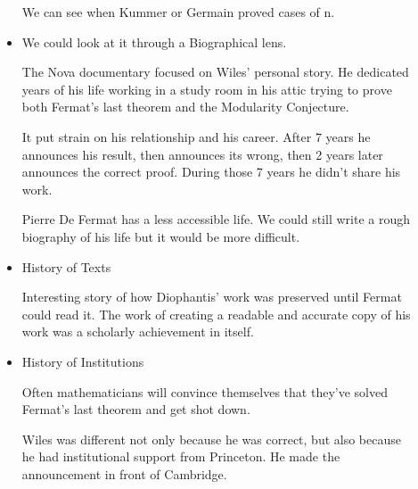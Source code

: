 \documentclass{report}
\begin{document}
\begin{description}
\begin{itemize}
\begin{mdframed}
                    We can see when Kummer or Germain
                    proved cases of n.
                \end{mdframed}
            \item We could look at it through a Biographical lens.
                \begin{mdframed}
                    The Nova documentary focused on Wiles'
                    personal story. He dedicated years of his
                    life working in a study room in his attic
                    trying to prove both Fermat's last theorem
                    and the Modularity Conjecture.

                    \vspace{10pt}

                    It put strain on his relationship and his
                    career. After 7 years he announces his result,
                    then announces its wrong, then 2 years later
                    announces the correct proof. During those
                    7 years he didn't share his work.
                \end{mdframed}
                \begin{mdframed}
                    Pierre De Fermat has a less accessible life.
                    We could still write a rough biography of his
                    life but it would be more difficult.
                \end{mdframed}
            \item History of Texts
                \begin{mdframed}
                    Interesting story of how Diophantis' work was
                    preserved until Fermat could read it. The
                    work of creating a readable and accurate
                    copy of his work was a scholarly achievement
                    in itself.
                \end{mdframed}
            \item History of Institutions
                \begin{mdframed}
                    Often mathematicians will convince themselves
                    that they've solved Fermat's last theorem
                    and get shot down.
                \end{mdframed}
                \begin{mdframed}
                    Wiles was different not only because he was
                    correct, but also because he had institutional
                    support from Princeton. He made the announcement
                    in front of Cambridge.


\end{mdframed}
\end{itemize}
\end{description}
\end{document}
